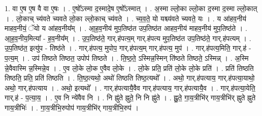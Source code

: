 \documentclass[17pt]{extarticle}
\begin{document}
1. वा ए॒ष ए॒ष वै वा ए॒षः । . ए॒षो᳚ऽस्मा द॒स्मादे॒ष ए॒षो᳚ऽस्मात् । . अ॒स्मा ल्लो॒का ल्लो॒का द॒स्मा द॒स्मा ल्लो॒कात् । . लो॒काच् च्य॑वते च्यवते लो॒का ल्लो॒काच् च्य॑वते । . च्य॒व॒ते॒ यो यश्च्य॑वते च्यवते॒ यः । . य आ॑हव॒नीय॑ माहव॒नीयं॒ ॅयो य आ॑हव॒नीय᳚म् । . आ॒ह॒व॒नीय॑ मुप॒तिष्ठ॑त उप॒तिष्ठ॑त आहव॒नीय॑ माहव॒नीय॑ मुप॒तिष्ठ॑ते । . आ॒ह॒व॒नीय॒मित्या᳚ - ह॒व॒नीय᳚म् । . उ॒प॒तिष्ठ॑ते॒ गार्.ह॑पत्य॒म् गार्.ह॑पत्य मुप॒तिष्ठ॑त उप॒तिष्ठ॑ते॒ गार्.ह॑पत्यम् । . उ॒प॒तिष्ठ॑त॒ इत्यु॑प - तिष्ठ॑ते । . गार्.ह॑पत्य॒ मुपोप॒ गार्.ह॑पत्य॒म् गार्.ह॑पत्य॒ मुप॑ । . गार्.ह॑पत्य॒मिति॒ गार्.ह॑ - प॒त्य॒म् । . उप॑ तिष्ठते तिष्ठत॒ उपोप॑ तिष्ठते । . ति॒ष्ठ॒ते॒ ऽस्मिन्न॒स्मिन् ति॑ष्ठते तिष्ठते॒ ऽस्मिन्न् । . अ॒स्मि न्ने॒वैवास्मि न्न॒स्मिन्ने॒व । . ए॒व लो॒के लो॒क ए॒वैव लो॒के । . लो॒के प्रति॒ प्रति॑ लो॒के लो॒के प्रति॑ । . प्रति॑ तिष्ठति तिष्ठति॒ प्रति॒ प्रति॑ तिष्ठति । . ति॒ष्ठ॒त्यथो॒ अथो॑ तिष्ठति तिष्ठ॒त्यथो᳚ । . अथो॒ गार्.ह॑पत्याय॒ गार्.ह॑पत्या॒याथो॒ अथो॒ गार्.ह॑पत्याय । . अथो॒ इत्यथो᳚ । . गार्.ह॑पत्यायै॒वैव गार्.ह॑पत्याय॒ गार्.ह॑पत्यायै॒व । . गार्.ह॑पत्या॒येति॒ गार्.ह॑ - प॒त्या॒य॒ । . ए॒व नि न्ये॑वैव नि । . नि ह्नु॑ते ह्नुते॒ नि नि ह्नु॑ते । . ह्नु॒ते॒ गा॒य॒त्रीभि॑र् गाय॒त्रीभि॑र् ह्नुते ह्नुते गाय॒त्रीभिः॑ । . गा॒य॒त्रीभि॒रुपोप॑ गाय॒त्रीभि॑र् गाय॒त्रीभि॒रुप॑ । \newline
\end{document}
